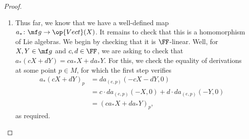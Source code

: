 \documentclass[../notes.tex]{subfiles}
\begin{document}
\begin{proof}
\begin{enumerate}

		\item Thus far, we know that we have a well-defined map $a_*\colon\mf g\to\op{Vect}(X)$. It remains to check that this is a homomorphism of Lie algebras. We begin by checking that it is $\FF$-linear. Well, for $X,Y\in\mf g$ and $c,d\in\FF$, we are asking to check that $a_*(cX+dY)=ca_*X+da_*Y$. For this, we check the equality of derivations at some point $p\in M$, for which the first step verifies
		\begin{align*}
			a_*(cX+dY)_p &= da_{(e,p)}(-cX-dY,0) \\
			&= c\cdot da_{(e,p)}(-X,0)+d\cdot da_{(e,p)}(-Y,0) \\
			&= (ca_*X+da_*Y)_p,
		\end{align*}
		as required.
		



\end{enumerate}
\end{proof}
\end{document}
